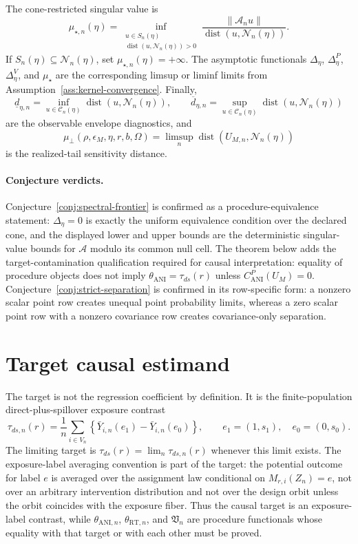 \documentclass[11pt]{article}
\theoremstyle{definition}
\theoremstyle{plain}
\theoremstyle{remark}
\begin{document}
The cone-restricted singular value is
\[
  \mu_{\star,n}(\eta)=
  \inf_{\substack{u\in S_n(\eta)\\
  \operatorname{dist}(u,\mathcal N_n(\eta))>0}}
  \frac{\|\mathcal A_nu\|}
       {\operatorname{dist}(u,\mathcal N_n(\eta))}.
\]
If \(S_n(\eta)\subseteq\mathcal N_n(\eta)\), set
\(\mu_{\star,n}(\eta)=+\infty\).  The asymptotic functionals
\(\Delta_\eta\), \(\Delta^P_\eta\), \(\Delta^V_\eta\), and \(\mu_\star\) are
the corresponding limsup or liminf limits from Assumption~\ref{ass:kernel-convergence}.
Finally,
\[
  \underline d_{\eta,n}
  =
  \inf_{u\in\mathcal C_n(\eta)}
  \operatorname{dist}(u,\mathcal N_n(\eta)),
  \qquad
  \overline d_{\eta,n}
  =
  \sup_{u\in\mathcal C_n(\eta)}
  \operatorname{dist}(u,\mathcal N_n(\eta))
\]
are the observable envelope diagnostics, and
\[
  \mu_{\perp}(\rho,\epsilon_M,\eta,r,b,\Omega)
  =
  \limsup_n \operatorname{dist}(U_{M,n},\mathcal N_n(\eta))
\]
is the realized-tail sensitivity distance.

\paragraph{Conjecture verdicts.}
Conjecture~\ref{conj:spectral-frontier} is confirmed as a
procedure-equivalence statement: \(\Delta_\eta=0\) is exactly the uniform
equivalence condition over the declared cone, and the displayed lower and
upper bounds are the deterministic singular-value bounds for \(\mathcal A\)
modulo its common null cell.  The theorem below adds the target-contamination
qualification required for causal interpretation: equality of procedure
objects does not imply \(\theta_{\mathrm{ANI}}=\tau_{ds}(r)\) unless
\(C^P_{\mathrm{ANI}}(U_M)=0\).  Conjecture~\ref{conj:strict-separation} is
confirmed in its row-specific form: a nonzero scalar point row creates
unequal point probability limits, whereas a zero scalar point row with a
nonzero covariance row creates covariance-only separation.

\section{Target causal estimand}
\label{sec:target-label}
The target is not the regression coefficient by definition.  It is the
finite-population direct-plus-spillover exposure contrast
\[
  \tau_{ds,n}(r)
  =
  \frac1n\sum_{i\in V_n}
  \left\{
    \bar Y_{i,n}(e_1)-\bar Y_{i,n}(e_0)
  \right\},
  \qquad
  e_1=(1,s_1),\quad e_0=(0,s_0).
\]
The limiting target is \(\tau_{ds}(r)=\lim_n\tau_{ds,n}(r)\) whenever this
limit exists.  The exposure-label averaging convention is part of the target:
the potential outcome for label \(e\) is averaged over the assignment law
conditional on \(M_{r,i}(Z_n)=e\), not over an arbitrary intervention
distribution and not over the design orbit unless the orbit coincides with
the exposure fiber.  Thus the causal target is an exposure-label contrast,
while \(\theta_{\mathrm{ANI},n}\), \(\theta_{\mathrm{RT},n}\), and
\(\mathfrak V_n\) are procedure functionals whose equality with that target or
with each other must be proved.
\end{document}
